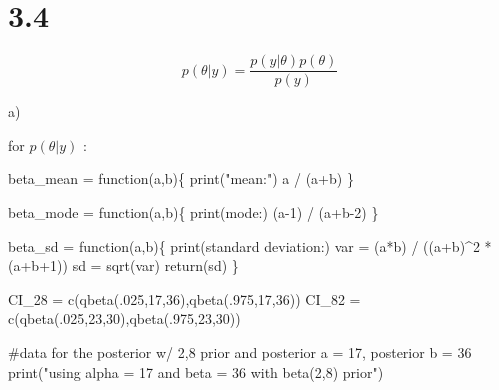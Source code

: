 \documentclass[
  letterpaper,
  DIV=11,
  numbers=noendperiod]{scrartcl}
\newenvironment{Shaded}{\begin{snugshade}}{\end{snugshade}}
\newcommand{\CommentTok}[1]{\textcolor[rgb]{0.37,0.37,0.37}{#1}}
\newcommand{\ControlFlowTok}[1]{\textcolor[rgb]{0.00,0.23,0.31}{#1}}
\newcommand{\DecValTok}[1]{\textcolor[rgb]{0.68,0.00,0.00}{#1}}
\newcommand{\FunctionTok}[1]{\textcolor[rgb]{0.28,0.35,0.67}{#1}}
\newcommand{\NormalTok}[1]{\textcolor[rgb]{0.00,0.23,0.31}{#1}}
\newcommand{\OtherTok}[1]{\textcolor[rgb]{0.00,0.23,0.31}{#1}}
\newcommand{\SpecialCharTok}[1]{\textcolor[rgb]{0.37,0.37,0.37}{#1}}
\newcommand{\StringTok}[1]{\textcolor[rgb]{0.13,0.47,0.30}{#1}}
\begin{document}
\hypertarget{section-2}{%
\section{3.4}\label{section-2}}

\[
p(\theta | y) = \frac{p(y|\theta)p(\theta)}{p(y)}
\]

a)

for \(p(\theta|y)\) :

\begin{Shaded}
\begin{Highlighting}[]
\NormalTok{beta\_mean }\OtherTok{=} \ControlFlowTok{function}\NormalTok{(a,b)\{}
  \FunctionTok{print}\NormalTok{(}\StringTok{"mean:"}\NormalTok{)}
\NormalTok{  a }\SpecialCharTok{/}\NormalTok{ (a}\SpecialCharTok{+}\NormalTok{b)}
\NormalTok{\}}

\NormalTok{beta\_mode }\OtherTok{=} \ControlFlowTok{function}\NormalTok{(a,b)\{}
  \FunctionTok{print}\NormalTok{(}\StringTok{\textquotesingle{}mode:\textquotesingle{}}\NormalTok{)}
\NormalTok{  (a}\DecValTok{{-}1}\NormalTok{) }\SpecialCharTok{/}\NormalTok{ (a}\SpecialCharTok{+}\NormalTok{b}\DecValTok{{-}2}\NormalTok{)}
\NormalTok{\}}

\NormalTok{beta\_sd }\OtherTok{=} \ControlFlowTok{function}\NormalTok{(a,b)\{}
  \FunctionTok{print}\NormalTok{(}\StringTok{\textquotesingle{}standard deviation:\textquotesingle{}}\NormalTok{)}
\NormalTok{  var }\OtherTok{=}\NormalTok{ (a}\SpecialCharTok{*}\NormalTok{b) }\SpecialCharTok{/}\NormalTok{ ((a}\SpecialCharTok{+}\NormalTok{b)}\SpecialCharTok{\^{}}\DecValTok{2} \SpecialCharTok{*}\NormalTok{ (a}\SpecialCharTok{+}\NormalTok{b}\SpecialCharTok{+}\DecValTok{1}\NormalTok{))}
\NormalTok{  sd }\OtherTok{=} \FunctionTok{sqrt}\NormalTok{(var)}
  \FunctionTok{return}\NormalTok{(sd) }
\NormalTok{\}}

\NormalTok{CI\_28 }\OtherTok{=} \FunctionTok{c}\NormalTok{(}\FunctionTok{qbeta}\NormalTok{(.}\DecValTok{025}\NormalTok{,}\DecValTok{17}\NormalTok{,}\DecValTok{36}\NormalTok{),}\FunctionTok{qbeta}\NormalTok{(.}\DecValTok{975}\NormalTok{,}\DecValTok{17}\NormalTok{,}\DecValTok{36}\NormalTok{))}
\NormalTok{CI\_82 }\OtherTok{=} \FunctionTok{c}\NormalTok{(}\FunctionTok{qbeta}\NormalTok{(.}\DecValTok{025}\NormalTok{,}\DecValTok{23}\NormalTok{,}\DecValTok{30}\NormalTok{),}\FunctionTok{qbeta}\NormalTok{(.}\DecValTok{975}\NormalTok{,}\DecValTok{23}\NormalTok{,}\DecValTok{30}\NormalTok{))}

\CommentTok{\#data for the posterior w/ 2,8 prior and posterior a = 17, posterior b = 36}
\FunctionTok{print}\NormalTok{(}\StringTok{"using alpha = 17 and beta = 36 with beta(2,8) prior"}\NormalTok{)}
\end{Highlighting}
\end{Shaded}
\end{document}
